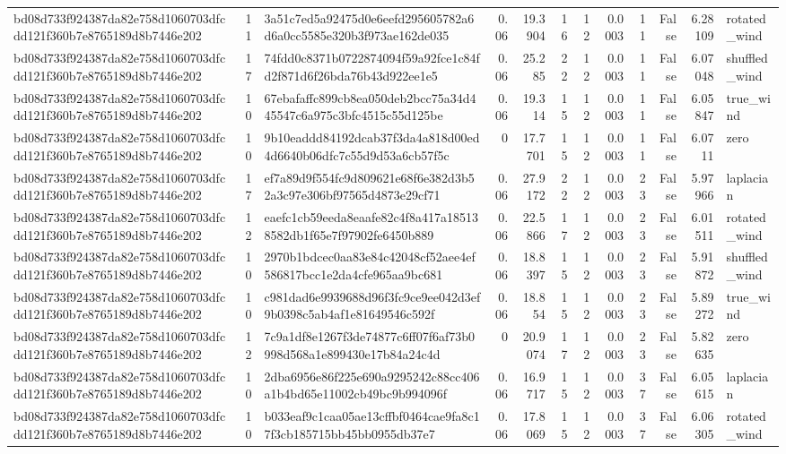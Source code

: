 \begin{tabular}{lrlrrrrrrrrl}
bd08d733f924387da82e758d1060703dfcdd121f360b7e8765189d8b7446e202 & 11 & 3a51c7ed5a92475d0e6eefd295605782a6d6a0cc5585e320b3f973ae162de035 & 0.06 & 19.3904 & 16 & 12 & 0.0003 & 11 & False & 6.28109 & rotated\_wind \\
bd08d733f924387da82e758d1060703dfcdd121f360b7e8765189d8b7446e202 & 17 & 74fdd0c8371b0722874094f59a92fce1c84fd2f871d6f26bda76b43d922ee1e5 & 0.06 & 25.285 & 22 & 12 & 0.0003 & 11 & False & 6.07048 & shuffled\_wind \\
bd08d733f924387da82e758d1060703dfcdd121f360b7e8765189d8b7446e202 & 10 & 67ebafaffc899cb8ea050deb2bcc75a34d445547c6a975c3bfc4515c55d125be & 0.06 & 19.314 & 15 & 12 & 0.0003 & 11 & False & 6.05847 & true\_wind \\
bd08d733f924387da82e758d1060703dfcdd121f360b7e8765189d8b7446e202 & 10 & 9b10eaddd84192dcab37f3da4a818d00ed4d6640b06dfc7c55d9d53a6cb57f5c & 0 & 17.7701 & 15 & 12 & 0.0003 & 11 & False & 6.0711 & zero \\
bd08d733f924387da82e758d1060703dfcdd121f360b7e8765189d8b7446e202 & 17 & ef7a89d9f554fc9d809621e68f6e382d3b52a3c97e306bf97565d4873e29cf71 & 0.06 & 27.9172 & 22 & 12 & 0.0003 & 23 & False & 5.97966 & laplacian \\
bd08d733f924387da82e758d1060703dfcdd121f360b7e8765189d8b7446e202 & 12 & eaefc1cb59eeda8eaafe82c4f8a417a185138582db1f65e7f97902fe6450b889 & 0.06 & 22.5866 & 17 & 12 & 0.0003 & 23 & False & 6.01511 & rotated\_wind \\
bd08d733f924387da82e758d1060703dfcdd121f360b7e8765189d8b7446e202 & 10 & 2970b1bdcec0aa83e84c42048cf52aee4ef586817bcc1e2da4cfe965aa9bc681 & 0.06 & 18.8397 & 15 & 12 & 0.0003 & 23 & False & 5.91872 & shuffled\_wind \\
bd08d733f924387da82e758d1060703dfcdd121f360b7e8765189d8b7446e202 & 10 & c981dad6e9939688d96f3fc9ce9ee042d3ef9b0398c5ab4af1e81649546c592f & 0.06 & 18.854 & 15 & 12 & 0.0003 & 23 & False & 5.89272 & true\_wind \\
bd08d733f924387da82e758d1060703dfcdd121f360b7e8765189d8b7446e202 & 12 & 7c9a1df8e1267f3de74877c6ff07f6af73b0998d568a1e899430e17b84a24c4d & 0 & 20.9074 & 17 & 12 & 0.0003 & 23 & False & 5.82635 & zero \\
bd08d733f924387da82e758d1060703dfcdd121f360b7e8765189d8b7446e202 & 10 & 2dba6956e86f225e690a9295242c88cc406a1b4bd65e11002cb49bc9b994096f & 0.06 & 16.9717 & 15 & 12 & 0.0003 & 37 & False & 6.05615 & laplacian \\
bd08d733f924387da82e758d1060703dfcdd121f360b7e8765189d8b7446e202 & 10 & b033eaf9c1caa05ae13cffbf0464cae9fa8c17f3cb185715bb45bb0955db37e7 & 0.06 & 17.8069 & 15 & 12 & 0.0003 & 37 & False & 6.06305 & rotated\_wind \\

\end{tabular}

